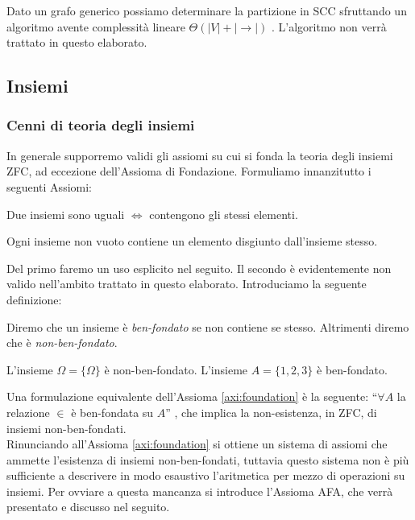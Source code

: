 Dato un grafo generico possiamo determinare la partizione in SCC sfruttando un algoritmo avente complessità lineare $\Theta(|V| + |\to|)$ \cite{tarjan}. L'algoritmo non verrà trattato in questo elaborato.

\subsection{Insiemi}
\subsubsection{Cenni di teoria degli insiemi}
In generale supporremo validi gli assiomi su cui si fonda la teoria degli insiemi ZFC, ad eccezione dell'Assioma di Fondazione. Formuliamo innanzitutto i seguenti Assiomi:
\begin{axiom}[di estensionalità]
    Due insiemi sono uguali $\iff$ contengono gli stessi elementi.
\end{axiom}
\begin{axiom}[di fondazione]
    Ogni insieme non vuoto contiene un elemento disgiunto dall'insieme stesso.
    \label{axi:foundation}
\end{axiom}
Del primo faremo un uso esplicito nel seguito. Il secondo è evidentemente non valido nell'ambito trattato in questo elaborato. Introduciamo la seguente definizione:
\begin{definition}
    Diremo che un insieme è \emph{ben-fondato} se non contiene se stesso. Altrimenti diremo che è \emph{non-ben-fondato}.
\end{definition}
\begin{example}
    L'insieme $\Omega = \{\Omega\}$ è non-ben-fondato. L'insieme $A = \{1,2,3\}$ è ben-fondato.
\end{example}
Una formulazione equivalente dell'Assioma \ref{axi:foundation} è la seguente: ``$\forall A$ la relazione $\in$ è ben-fondata su $A$'' \cite[Chapter III.4]{kunen}, che implica la non-esistenza, in ZFC, di insiemi non-ben-fondati.\\
Rinunciando all'Assioma \ref{axi:foundation} si ottiene un sistema di assiomi che ammette l'esistenza di insiemi non-ben-fondati, tuttavia questo sistema non è più sufficiente a descrivere in modo esaustivo l'aritmetica per mezzo di operazioni su insiemi. Per ovviare a questa mancanza si introduce l'Assioma AFA, che verrà presentato e discusso nel seguito.


